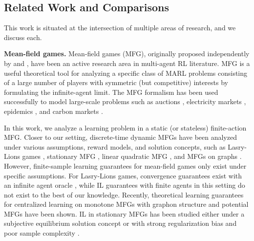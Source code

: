 
\subsection{Related Work and Comparisons}
This work is situated at the intersection of multiple areas of research, and we discuss each.

\textbf{Mean-field games.}
Mean-field games (MFG), originally proposed independently by \citet{lasry2007mean} and \citet{huang2006large}, have been an active research area in multi-agent RL literature.
MFG is a useful theoretical tool for analyzing a specific class of MARL problems consisting of a large number of players with symmetric (but competitive) interests by formulating the infinite-agent limit.
The MFG formalism has been used successfully to model large-scale problems such as
auctions \citep{pinasco2023learning},
electricity markets \citep{gomes2021mean},
epidemics \citep{aurell2022finite, huang2022game}, 
and carbon markets \citep{carmona2022mean}.


In this work, we analyze a learning problem in a static (or stateless) finite-action MFG.
Closer to our setting, discrete-time dynamic MFGs have been analyzed under various assumptions, reward models, and solution concepts, such as Lasry-Lions games \citep{perrin2020fictitious,perolat2022scaling}, stationary MFG \citep{anahtarci2022q,xie2021learning,zaman2023oracle, yardim2023policy}, linear quadratic MFG \citep{guo2022entropy, fu2019actor}, and MFGs on graphs \citep{yang2017learning,gu2021mean}.
However, finite-sample learning guarantees for mean-field games only exist under specific assumptions.
For Lasry-Lions games, convergence guarantees exist with an infinite agent oracle \citep{perrin2020fictitious, zhang2024learning}, while IL guarantees with finite agents in this setting do not exist to the best of our knowledge.
Recently, theoretical learning guarantees for centralized learning on monotone MFGs with graphon structure \citep{zhang2024learning} and potential MFGs \citep{geist2021concave} have been shown.
IL in stationary MFGs has been studied either under a subjective equilibrium solution concept \citep{yongacoglu2022independent} or with strong regularization bias and  poor sample complexity \citep{yardim2023policy}.

